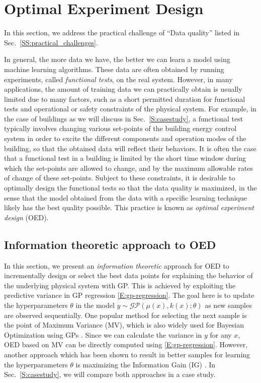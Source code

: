 \section{Optimal Experiment Design}
\label{S:oed}

In this section, we address the practical challenge of ``Data quality'' listed in Sec.~\ref{SS:practical_challenges}.

In general, the more data we have, the better we can learn a model using machine learning algorithms.
These data are often obtained by running experiments, called \emph{functional tests}, on the real system.
However, in many applications, the amount of training data we can practically obtain is usually limited due to many factors, such as a short permitted duration for functional tests and operational or safety constraints of the physical system.
For example, in the case of buildings as we will discuss in Sec.~\ref{S:casestudy}, a functional test typically involves changing various set-points of the building energy control system in order to excite the different components and operation modes of the building, so that the obtained data will reflect their behaviors.
It is often the case that a functional test in a building is limited by the short time window during which the set-points are allowed to change, and by the maximum allowable rates of change of these set-points.
Subject to these constraints, it is desirable to optimally design the functional tests so that the data quality is maximized, in the sense that the model obtained from the data with a specific learning technique likely has the best quality possible.
This practice is known as \emph{optimal experiment design} (OED).


\subsection{Information theoretic approach to OED}
\label{SS:information-theory}

In this section, we present an \emph{information theoretic} approach for OED to incrementally design or select the best data points for explaining the behavior of the underlying physical system with GP.
This is achieved by exploiting the predictive variance in GP regression \eqref{E:gp-regression}.
The goal here is to update the hyperparameters \(\theta\) in the model \(y \sim \mathcal{GP}(\mu(x), k(x); \theta)\) as new samples are observed sequentially.
One popular method for selecting the next sample is the point of Maximum Variance (MV), which is also widely used for Bayesian Optimization using GPs \cite{Snoek2012}.
Since we can calculate the variance in \(y\) for any \(x\), OED based on MV can be directly computed using \eqref{E:gp-regression}.
However, another approach which has been shown to result in better samples for learning the hyperparameters \(\theta\) is maximizing the Information Gain (IG) \cite{Krause2008}. In Sec.~\ref{S:casestudy}, we will compare both approaches in a case study.

